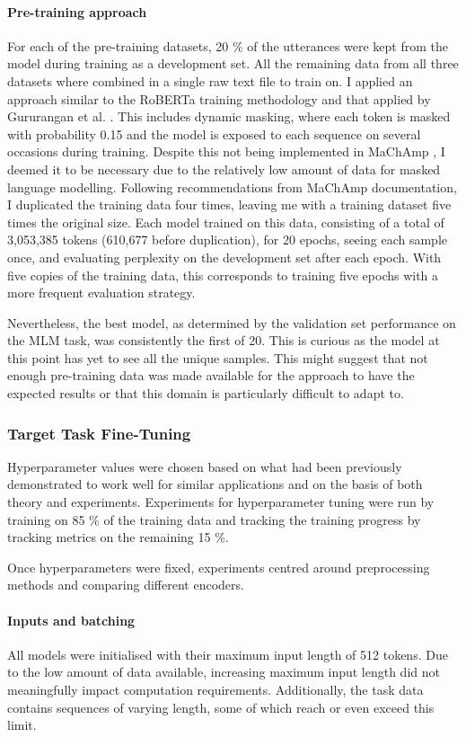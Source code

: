 \documentclass[12pt]{report}
\begin{document}
\paragraph*{Pre-training approach}
For each of the pre-training datasets, 20 \% of the utterances were kept from the model during training as a development set.
All the remaining data from all three datasets where combined in a single raw text file to train on.
I applied an approach similar to the RoBERTa training methodology and that applied by Gururangan et al. \citeyear{Gururangan2020}.
This includes dynamic masking, where each token is masked with probability 0.15 and the model is exposed to each sequence on several occasions during training.
Despite this not being implemented in MaChAmp \cite{MaChAmp}, I deemed it to be necessary due to the relatively low amount of data for masked language modelling.
Following recommendations from MaChAmp documentation, I duplicated the training data four times, leaving me with a training dataset five times the original size.
Each model trained on this data, consisting of a total of 3,053,385 tokens (610,677 before duplication), for 20 epochs, seeing each sample once, and evaluating perplexity on the development set after each epoch.
With five copies of the training data, this corresponds to training five epochs with a more frequent evaluation strategy.

Nevertheless, the best model, as determined by the validation set performance on the MLM task, was consistently the first of 20.
This is curious as the model at this point has yet to see all the unique samples.
This might suggest that not enough pre-training data was made available for the approach to have the expected results or that this domain is particularly difficult to adapt to.

\subsubsection{Target Task Fine-Tuning}
Hyperparameter values were chosen based on what had been previously demonstrated to work well for similar applications and on the basis of both theory and experiments.
Experiments for hyperparameter tuning were run by training on 85 \% of the training data and tracking the training progress by tracking metrics on the remaining 15 \%.

Once hyperparameters were fixed, experiments centred around preprocessing methods and comparing different encoders.

\paragraph*{Inputs and batching}
All models were initialised with their maximum input length of 512 tokens.
Due to the low amount of data available, increasing maximum input length did not meaningfully impact computation requirements.
Additionally, the task data contains sequences of varying length, some of which reach or even exceed this limit.
\end{document}
